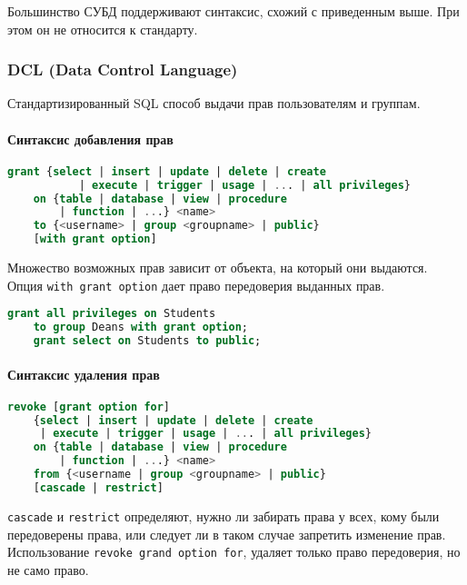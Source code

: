 \begin{remark}
	Большинство СУБД поддерживают синтаксис, схожий с приведенным выше. При этом он не относится к
	стандарту.
\end{remark}

\subsubsection{DCL (Data Control Language)}

Стандартизированный SQL способ выдачи прав пользователям и группам.

\paragraph{Синтаксис добавления прав}
\enewline

\begin{lstlisting}[language=SQL]
    grant {select | insert | update | delete | create
           | execute | trigger | usage | ... | all privileges}
    on {table | database | view | procedure
        | function | ...} <name>
    to {<username> | group <groupname> | public}
    [with grant option]
\end{lstlisting}

Множество возможных прав зависит от объекта, на который они выдаются. Опция \texttt{with grant option}
дает право передоверия выданных прав.

\begin{examples}
	\enewline
	\begin{lstlisting}[language=SQL]
    grant all privileges on Students
    to group Deans with grant option;
    grant select on Students to public;
    \end{lstlisting}
\end{examples}

\paragraph{Синтаксис удаления прав}
\enewline

\begin{lstlisting}[language=SQL]
    revoke [grant option for]
    {select | insert | update | delete | create
     | execute | trigger | usage | ... | all privileges}
    on {table | database | view | procedure
        | function | ...} <name>
    from {<username | group <groupname> | public}
    [cascade | restrict]
\end{lstlisting}

\texttt{cascade} и \texttt{restrict} определяют, нужно ли забирать права у всех, кому
были
передоверены права, или следует ли в таком случае запретить изменение прав. Использование
\texttt{revoke grand option for}, удаляет только право передоверия, но не само право.

